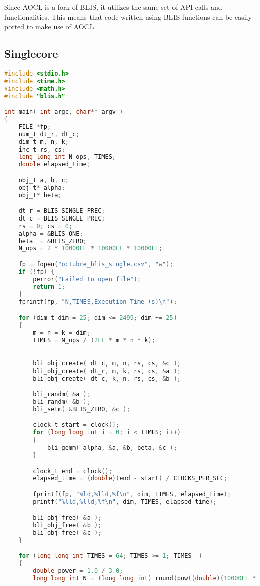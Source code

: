 Since AOCL is a fork of BLIS, it utilizes the same set of API calls and functionalities. This means that code written using BLIS functions can be easily ported to make use of AOCL.

\subsection*{Singlecore}
\vspace{-1em}
\begin{lstlisting}[language=C]
#include <stdio.h>
#include <time.h>
#include <math.h>
#include "blis.h"

int main( int argc, char** argv )
{
    FILE *fp;
    num_t dt_r, dt_c;
    dim_t m, n, k;
    inc_t rs, cs;
    long long int N_ops, TIMES;
    double elapsed_time;

    obj_t a, b, c;
    obj_t* alpha;
    obj_t* beta;

    dt_r = BLIS_SINGLE_PREC;
    dt_c = BLIS_SINGLE_PREC;
    rs = 0; cs = 0;
    alpha = &BLIS_ONE;
    beta  = &BLIS_ZERO;
    N_ops = 2 * 10000LL * 10000LL * 10000LL;

    fp = fopen("octubre_blis_single.csv", "w");
    if (!fp) {
        perror("Failed to open file");
        return 1;
    }
    fprintf(fp, "N,TIMES,Execution Time (s)\n");

    for (dim_t dim = 25; dim <= 2499; dim += 25)
    {
        m = n = k = dim;
        TIMES = N_ops / (2LL * m * n * k);

        
        bli_obj_create( dt_c, m, n, rs, cs, &c );
        bli_obj_create( dt_r, m, k, rs, cs, &a );
        bli_obj_create( dt_c, k, n, rs, cs, &b );

        bli_randm( &a );
        bli_randm( &b );
        bli_setm( &BLIS_ZERO, &c );

        clock_t start = clock();
        for (long long int i = 0; i < TIMES; i++)
        {
            bli_gemm( alpha, &a, &b, beta, &c );
        }

        clock_t end = clock();
        elapsed_time = (double)(end - start) / CLOCKS_PER_SEC;

        fprintf(fp, "%ld,%lld,%f\n", dim, TIMES, elapsed_time);
        printf("%lld,%lld,%f\n", dim, TIMES, elapsed_time);

        bli_obj_free( &a );
        bli_obj_free( &b );
        bli_obj_free( &c );
    }

    for (long long int TIMES = 64; TIMES >= 1; TIMES--)
    {
        double power = 1.0 / 3.0;
        long long int N = (long long int) round(pow((double)(10000LL * 10000LL * 10000LL) / TIMES, power));


\end{lstlisting}
